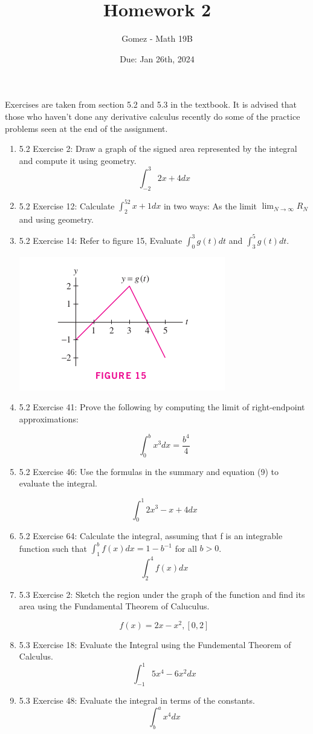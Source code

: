 \documentclass[11pt]{article}
\title{Homework 2}
\author{Gomez - Math 19B}
\date{Due: Jan 26th, 2024}
\begin{document}
\maketitle

\noindent 
\normalsize
\raggedright

Exercises are taken from section 5.2 and 5.3 in the textbook. It is advised that those who haven't done any derivative calculus recently do some of the practice problems seen at the end of the assignment. 


\begin{enumerate}

\item 
5.2 Exercise 2: Draw a graph of the signed area represented by the integral and compute it using geometry. 
\[
\int_{-2}^{3} 2x + 4 dx
\]

\item 
5.2 Exercise 12: Calculate $\int_2^52x+1 dx$ in two ways: As the limit $\lim_{N\to\infty} R_N$ and using geometry.

\item 
5.2 Exercise 14: Refer to figure 15, Evaluate $\int_0^3 g(t) dt$ and $\int_3^5 g(t) dt$. 

\begin{center}
    \includegraphics[width=.5\textwidth]{Sect 5.2 Exercise 14-15.png}
\end{center}

\item 
5.2 Exercise 41: Prove the following by computing the limit of right-endpoint approximations:

\[
\int_0^b x^3 dx = \frac{b^4}{4}
\]

\item 
5.2 Exercise 46: Use the formulas in the summary and equation (9) to evaluate the integral. 

\[
\int_0^1 2x^3 - x + 4 dx
\]
\item 
5.2 Exercise 64: Calculate the integral, assuming that f is an integrable function such that $\int_1^bf(x)dx = 1 - b^{-1}$ for all $b > 0$.
\[
\int_2^4f(x)dx
\]

\item 
5.3 Exercise 2: Sketch the region under the graph of the function and find its area using the Fundamental Theorem of Caluculus.

\[
    f(x) = 2x - x^2, [0, 2]
\]

\item 
5.3 Exercise 18: Evaluate the Integral using the Fundemental Theorem of Calculus. 
\[
    \int_{-1}^{1} 5x^4 - 6x^2 dx
\]

\item 
5.3 Exercise 48: Evaluate the integral in terms of the constants.
\[
\int_b^ax^4dx
\]
\end{enumerate}
\end{document}
